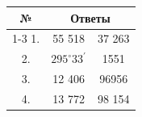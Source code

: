 \documentclass[kvant.tex]{subfiles}
\begin{document}
\begin{center}
\begin{tabular}{ | c | c | c | }
\hline
 №  &  \multicolumn{2}{c|}{Ответы} \\  \cline{1-3} 
 1. & 55 518 & 37 263 \\ 
 2. & ${295^\circ}{33^\prime}$ & 1551 \\  
 3. & 12 406 & 96956 \\  
 4. & 13 772 & 98 154  \\
\hline
\end{tabular}
\end{center}
\end{document}
